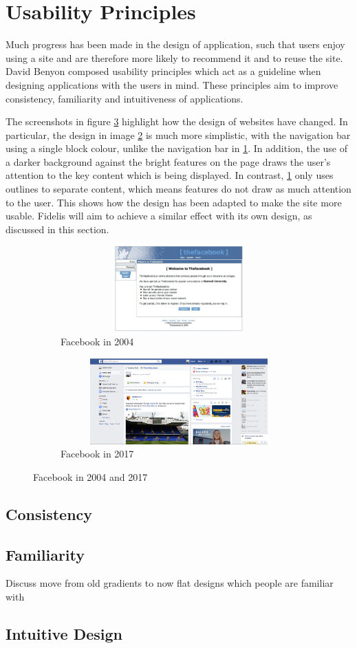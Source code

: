 \section{Usability Principles}
Much progress has been made in the design of application, such that users enjoy using a site and are therefore more likely to recommend it and to reuse the site. David Benyon composed usability principles which act as a guideline when designing applications with the users in mind. These principles aim to improve consistency, familiarity and intuitiveness of applications.

The screenshots in figure \ref{fig:Facebook_Changes} highlight how the design of websites have changed. In particular, the design in image \ref{fig:Facebook_2017} is much more simplistic, with the navigation bar using a single block colour, unlike the navigation bar in \ref{fig:Facebook_2004}. In addition, the use of a darker background against the bright features on the page draws the user's attention to the key content which is being displayed. In contrast, \ref{fig:Facebook_2004} only uses outlines to separate content, which means features do not draw as much attention to the user. This shows how the design has been adapted to make the site more usable. Fidelis will aim to achieve a similar effect with its own design, as discussed in this section.

\begin{figure}[H]
	\centering
	\begin{subfigure}[t]{0.45\textwidth}
		\centering
		\includegraphics[width=1.0\textwidth, height=125px]{Images/Design/Facebook_2004}
		\caption{Facebook in 2004}\label{fig:Facebook_2004}		
	\end{subfigure}
	\quad
	\begin{subfigure}[t]{0.45\textwidth}
		\centering
		\includegraphics[width=1.0\textwidth, height=125px]{Images/Design/Facebook_2017}
		\caption{Facebook in 2017}\label{fig:Facebook_2017}
	\end{subfigure}
	\caption{Facebook in 2004 and 2017}\label{fig:Facebook_Changes}
\end{figure}

\subsection{Consistency}

\subsection{Familiarity}
Discuss move from old gradients to now flat designs which people are familiar with

\subsection{Intuitive Design}